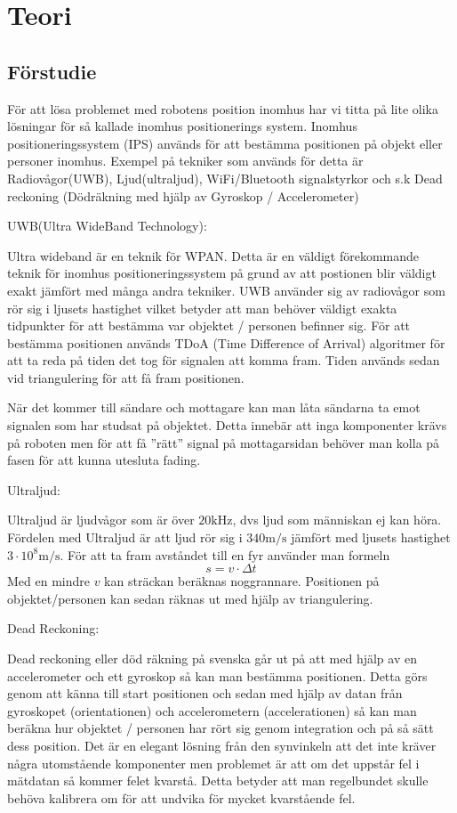 \documentclass[11pt, a4paper]{report}
\begin{document}
\chapter{Teori}

\section{Förstudie}

För att lösa problemet med robotens position inomhus har vi titta på lite olika lösningar för så kallade inomhus positionerings system. Inomhus positioneringssystem (IPS) används för att bestämma positionen på objekt eller personer inomhus. Exempel på  tekniker som används för detta är Radiovågor(UWB), Ljud(ultraljud), WiFi/Bluetooth signalstyrkor och s.k Dead reckoning (Dödräkning med hjälp av Gyroskop / Accelerometer)


UWB(Ultra WideBand Technology):

Ultra wideband är en teknik för WPAN. Detta är en väldigt förekommande teknik för inomhus positioneringssystem på grund av att postionen blir väldigt exakt jämfört med många andra tekniker. UWB använder sig av radiovågor som rör sig i ljusets hastighet vilket betyder att man behöver väldigt exakta tidpunkter för att bestämma var objektet / personen befinner sig. För att bestämma positionen används TDoA (Time Difference of Arrival) algoritmer för att ta reda på tiden det tog för signalen att komma fram. Tiden används sedan vid triangulering för att få fram positionen.

När det kommer till sändare och mottagare kan man låta sändarna ta emot signalen som har studsat på objektet. Detta innebär att inga komponenter krävs på roboten men för att få ''rätt'' signal på mottagarsidan behöver man kolla på fasen för att kunna utesluta fading.

Ultraljud:

Ultraljud är ljudvågor som är över $20\textrm{kHz}$, dvs ljud som människan ej kan höra. Fördelen med Ultraljud är att ljud rör sig i $340\textrm{m/s}$ jämfört med ljusets hastighet $3 \cdot 10^{8}\textrm{m/s}$. För att ta fram avståndet till en fyr använder man formeln
\begin{equation}
s = v \cdot \Delta t
\end{equation}
Med en mindre $v$ kan sträckan beräknas noggrannare. Positionen på objektet/personen kan sedan räknas ut med hjälp av triangulering.

Dead Reckoning:

Dead reckoning eller död räkning på svenska går ut på att med hjälp av en accelerometer och ett gyroskop så kan man bestämma positionen. Detta görs genom att känna till start positionen och sedan med hjälp av datan från gyroskopet (orientationen) och accelerometern (accelerationen) så kan man beräkna hur objektet / personen har rört sig genom integration och  på så sätt dess position. Det är en elegant lösning från den synvinkeln att det inte kräver några utomstående komponenter men problemet är att om det uppstår fel i mätdatan så kommer felet kvarstå. Detta betyder att man regelbundet skulle behöva kalibrera om för att undvika för mycket kvarstående fel.
\end{document}
